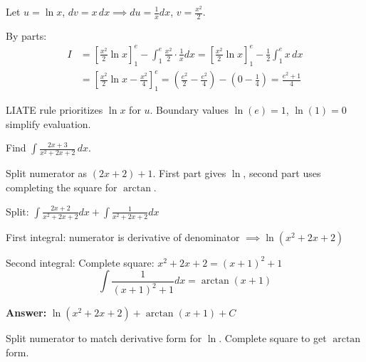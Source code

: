 \begin{solution}
Let $u = \ln x$, $dv = x \, dx \implies du = \frac{1}{x}dx$, $v = \frac{x^2}{2}$.

By parts:
\begin{align*}
I &= \left[ \frac{x^2}{2} \ln x \right]_{1}^{e} - \int_{1}^{e} \frac{x^2}{2} \cdot \frac{1}{x} dx = \left[ \frac{x^2}{2} \ln x \right]_{1}^{e} - \frac{1}{2}\int_{1}^{e} x \, dx \\
&= \left[ \frac{x^2}{2} \ln x - \frac{x^2}{4} \right]_{1}^{e} = \left(\frac{e^2}{2} - \frac{e^2}{4}\right) - \left(0 - \frac{1}{4}\right) = \boxed{\frac{e^2 + 1}{4}}
\end{align*}
\end{solution}

\begin{takeaways}
LIATE rule prioritizes $\ln x$ for $u$. Boundary values $\ln(e)=1$, $\ln(1)=0$ simplify evaluation.
\end{takeaways}

\vspace{1cm}

\begin{problem}
Find $\displaystyle \int \frac{2x+3}{x^2+2x+2} \, dx$.
\end{problem}

\begin{hint}
Split numerator as $(2x+2) + 1$. First part gives $\ln$, second part uses completing the square for $\arctan$.
\end{hint}

\begin{solution}
Split: $\displaystyle \int \frac{2x+2}{x^2+2x+2} dx + \int \frac{1}{x^2+2x+2} dx$

First integral: numerator is derivative of denominator $\implies \ln(x^2+2x+2)$

Second integral: Complete square: $x^2+2x+2 = (x+1)^2 + 1$
\[
\int \frac{1}{(x+1)^2 + 1} dx = \arctan(x+1)
\]

\textbf{Answer:} $\boxed{\ln(x^2+2x+2) + \arctan(x+1) + C}$
\end{solution}

\begin{takeaways}
Split numerator to match derivative form for $\ln$. Complete square to get $\arctan$ form.
\end{takeaways}

\vspace{1cm}

